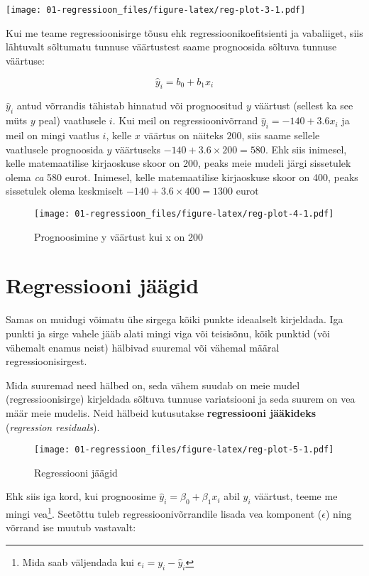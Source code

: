 \documentclass[
]{book}
\begin{document}
\texttt{[image: 01-regressioon\_files/figure-latex/reg-plot-3-1.pdf]}

Kui me teame regressioonisirge tõusu ehk regressioonikoefitsienti ja vabaliiget, siis lähtuvalt sõltumatu tunnuse väärtustest saame prognoosida sõltuva tunnuse väärtuse:

\begin{equation}
\hat{y}_i=b_0+b_1x_i
\end{equation}

\(\hat{y}_i\) antud võrrandis tähistab hinnatud või prognoositud \(y\) väärtust (sellest ka see müts \(y\) peal) vaatlusele \(i\). Kui meil on regressioonivõrrand \(\hat{y}_i=-140+3.6x_i\) ja meil on mingi vaatlus \(i\), kelle \(x\) väärtus on näiteks \(200\), siis saame sellele vaatlusele prognoosida \(y\) väärtuseks \(-140+3.6\times200=580\). Ehk siis inimesel, kelle matemaatilise kirjaoskuse skoor on 200, peaks meie mudeli järgi sissetulek olema \emph{ca} 580 eurot. Inimesel, kelle matemaatilise kirjaoskuse skoor on 400, peaks sissetulek olema keskmiselt \(-140+3.6\times400=1300\) eurot

\begin{figure}
\centering
\texttt{[image: 01-regressioon\_files/figure-latex/reg-plot-4-1.pdf]}
\caption{\label{fig:reg-plot-4}Prognoosimine y väärtust kui x on 200}
\end{figure}

\hypertarget{regressiooni-juxe4uxe4gid}{%
\section{Regressiooni jäägid}\label{regressiooni-juxe4uxe4gid}}

Samas on muidugi võimatu ühe sirgega kõiki punkte ideaalselt kirjeldada. Iga punkti ja sirge vahele jääb alati mingi viga või teisisõnu, kõik punktid (või vähemalt enamus neist) hälbivad suuremal või vähemal määral regressioonisirgest.

Mida suuremad need hälbed on, seda vähem suudab on meie mudel (regressioonisirge) kirjeldada sõltuva tunnuse variatsiooni ja seda suurem on vea määr meie mudelis. Neid hälbeid kutusutakse \textbf{regressiooni jääkideks} (\emph{regression residuals}).

\begin{figure}
\centering
\texttt{[image: 01-regressioon\_files/figure-latex/reg-plot-5-1.pdf]}
\caption{\label{fig:reg-plot-5}Regressiooni jäägid}
\end{figure}

Ehk siis iga kord, kui prognoosime \(\hat{y}_i=\beta_0+\beta_1x_i\) abil \(y_i\) väärtust, teeme me mingi vea\footnote{Mida saab väljendada kui \(\epsilon_i=y_i-\hat{y}_i\)}. Seetõttu tuleb regressioonivõrrandile lisada vea komponent (\(\epsilon\)) ning võrrand ise muutub vastavalt:
\end{document}
